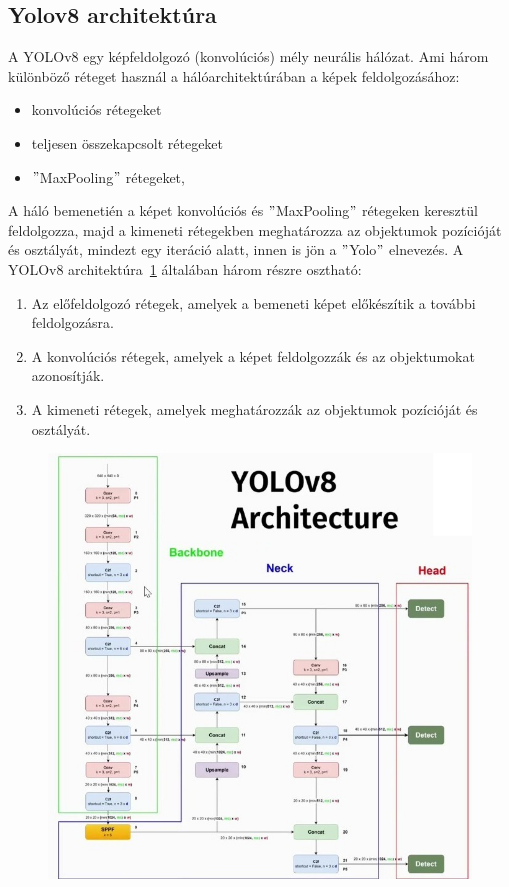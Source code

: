 \documentclass[12pt,oneside,a4paper]{article}
\theoremstyle{remark}
\begin{document}
\subsection{Yolov8 architektúra}\label{subsec:yolov8-architektura}
    A YOLOv8 egy képfeldolgozó (konvolúciós) mély neurális hálózat.
    Ami három különböző réteget használ a hálóarchitektúrában a képek feldolgozásához:
    \begin{itemize}
        \item konvolúciós rétegeket
        \item teljesen összekapcsolt rétegeket
        \item \("\)MaxPooling\("\) rétegeket,
    \end{itemize}

    A háló bemenetién a képet  konvolúciós és \("\)MaxPooling\("\) rétegeken keresztül feldolgozza,
    majd a kimeneti rétegekben meghatározza az objektumok pozícióját és osztályát, mindezt egy iteráció alatt,
    innen is jön a \("\)\gls{Yolo}\("\) elnevezés.
    \newpage
    A YOLOv8 architektúra~\ref{fig:Yolov8} általában három részre osztható:
    \begin{enumerate}
        \item Az előfeldolgozó rétegek, amelyek a bemeneti képet előkészítik a további feldolgozásra.
        \item A konvolúciós rétegek, amelyek a képet feldolgozzák és az objektumokat azonosítják.
        \item A kimeneti rétegek, amelyek meghatározzák az objektumok pozícióját és osztályát.
    \end{enumerate}
    \begin{figure}[ht]
        \centering
        \noindent\includegraphics[width=0.85\linewidth]{maxresdefault}
        \label{fig:Yolov8}
    \end{figure}
\end{document}
